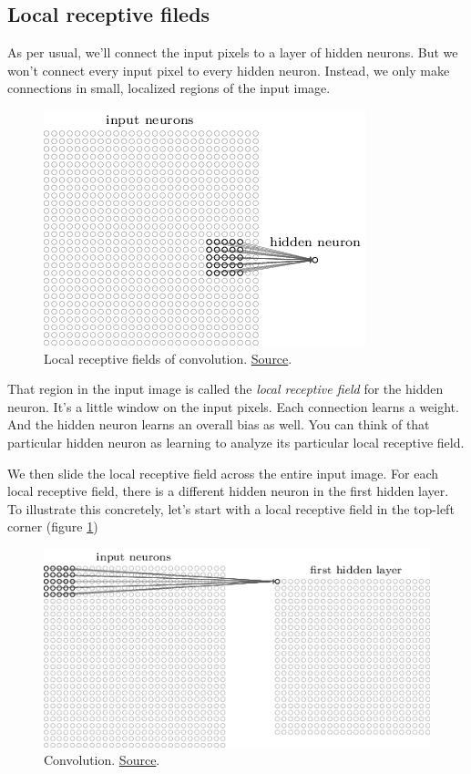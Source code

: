 \documentclass[a4paper]{tufte-handout}
\begin{document}
\subsection{Local receptive fileds}

As per usual, we'll connect the input pixels to a layer of hidden
neurons. But we won't connect every input pixel to every hidden neuron.
Instead, we only make connections in small, localized regions of the
input image.

\begin{figure}
\includegraphics[width=0.8\linewidth]{conv1}
\caption{Local receptive fields of convolution.
\href{http://neuralnetworksanddeeplearning.com/chap6.html\%22}{Source}.
}
\end{figure}


That region in the input image is called the \emph{local receptive
field} for the hidden neuron. It's a little window on the input pixels.
Each connection learns a weight. And the hidden neuron learns an overall
bias as well. You can think of that particular hidden neuron as learning
to analyze its particular local receptive field.

We then slide the local receptive field across the entire input image.
For each local receptive field, there is a different hidden neuron in
the first hidden layer. To illustrate this concretely, let's start with
a local receptive field in the top-left corner (figure \ref{fig:conv2s})

\begin{figure}
  \includegraphics[width=\linewidth]{conv2}
  \caption{Convolution.
\href{http://neuralnetworksanddeeplearning.com/chap6.html\%22}{Source}.
}
\label{fig:conv2s}
\end{figure}
\end{document}
